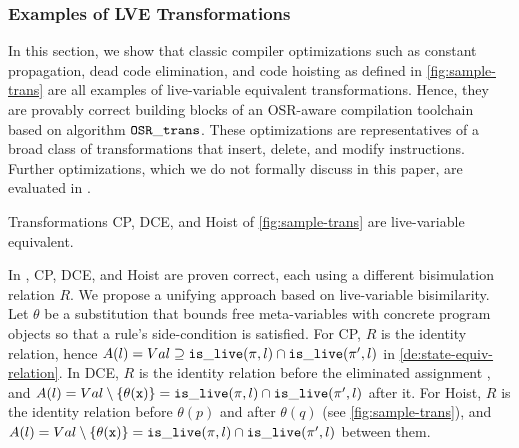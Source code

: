 \subsubsection{Examples of LVE Transformations}

\label{ss:lve-trans}

In this section, we show that classic compiler optimizations such as constant propagation, dead code elimination, and code hoisting as defined in \myfigure\ref{fig:sample-trans} are all examples of live-variable equivalent transformations. Hence, they are provably correct building blocks of an OSR-aware compilation toolchain based on algorithm $\text{${\tt OSR\_trans}$}$. These optimizations are representatives of a broad class of transformations that insert, delete, and modify instructions. Further optimizations, which we do not formally discuss in this paper, are evaluated in \missing.

\begin{theorem}
\label{th:lve-trans-examples}
Transformations CP, DCE, and Hoist of \myfigure\ref{fig:sample-trans} are live-variable equivalent.
\end{theorem}

\begin{myproof}
\missing
In \cite{Lacey04}, CP, DCE, and Hoist are proven correct, each using a different bisimulation relation $R$. We propose a unifying approach based on live-variable bisimilarity. Let $\theta$ be a substitution that bounds free meta-variables with concrete program objects so that a rule's side-condition is satisfied. For CP, $R$ is the identity relation, hence $A(l)=Val\supseteq \text{${\tt is\_live}$}(\pi,l)\cap \text{${\tt is\_live}$}(\pi',l)$ in \mydefinition\ref{de:state-equiv-relation}. In DCE, $R$ is the identity relation before the eliminated assignment , and $A(l)=Val\setminus\{\theta(\text{${\tt x}$})\}=\text{${\tt is\_live}$}(\pi,l)\cap \text{${\tt is\_live}$}(\pi',l)$ after it. For Hoist, $R$ is the identity relation before $\theta(p)$ and after $\theta(q)$ (see \myfigure\ref{fig:sample-trans}), and $A(l)=Val\setminus\{\theta(\text{${\tt x}$})\}=\text{${\tt is\_live}$}(\pi,l)\cap \text{${\tt is\_live}$}(\pi',l)$ between them.
\end{myproof}